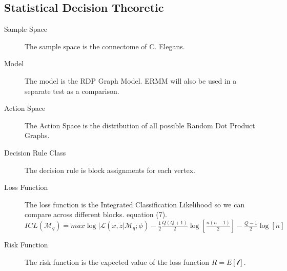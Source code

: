 \documentclass[12pt]{article}
\begin{document}
\subsection*{Statistical Decision Theoretic}
\begin{description}
\item[Sample Space]
The sample space is the connectome of C. Elegans.
\item[Model]
The model is the RDP Graph Model.  
ERMM will also be used in a separate test as a comparison.
\item[Action Space]
The Action Space is the distribution of all possible Random Dot Product Graphs.

\item[Decision Rule Class]
The decision rule is block assignments for each vertex.

\item[Loss Function]
The loss function is the Integrated Classification Likelihood so we can compare
across different blocks. \cite{2014PLoSO...997584P} equation (7).\\
$ICL(\mathscr{M}_{q}) = max\log | \mathscr{L}(x, \tilde{z}|\mathscr{M}_{q};\phi) -
\frac{1}{2}\frac{Q(Q+1)}{2} \log\left[\frac{n(n-1)}{2}\right] - \frac{Q-1}{2}
\log\left[n\right]$\\
\item[Risk Function]
The risk function is the expected value of the loss function 
$R = E[\mathscr{l}]$.

\end{description}

\end{document}
